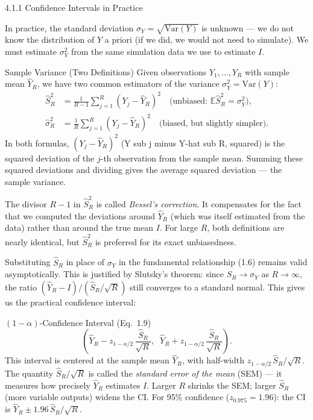 \documentclass[aspectratio=169,10pt]{beamer}
\begin{document}
\begin{frame}[allowframebreaks]{4.1.1 Confidence Intervals in Practice}

In practice, the standard deviation $\sigma_Y = \sqrt{\mathrm{Var}(Y)}$
is unknown --- we do not know the distribution of $Y$ a priori (if we did,
we would not need to simulate).  We must estimate $\sigma_Y^2$ from the
same simulation data we use to estimate $I$.

\begin{block}{Sample Variance (Two Definitions)}
  Given observations $Y_1, \ldots, Y_R$ with sample mean $\hat{Y}_R$,
  we have two common estimators of the variance $\sigma_Y^2 =
  \mathrm{Var}(Y)$:
  \begin{align*}
    \hat{S}_R^2 &= \frac{1}{R-1} \sum_{j=1}^{R} (Y_j - \hat{Y}_R)^2
      \quad \text{(unbiased: $\mathbb{E}\hat{S}_R^2 = \sigma_Y^2$),} \\[6pt]
    \hat{\sigma}_R^2 &= \frac{1}{R} \sum_{j=1}^{R} (Y_j - \hat{Y}_R)^2
      \quad \text{(biased, but slightly simpler).}
  \end{align*}
  In both formulas, $(Y_j - \hat{Y}_R)^2$ (Y sub j minus Y-hat sub R,
  squared) is the squared deviation of the $j$-th observation from the
  sample mean.  Summing these squared deviations and dividing gives
  the average squared deviation --- the sample variance.

  The divisor $R - 1$ in $\hat{S}_R^2$ is called \emph{Bessel's
  correction}.  It compensates for the fact that we computed the
  deviations around $\hat{Y}_R$ (which was itself estimated from the
  data) rather than around the true mean $I$.  For large $R$, both
  definitions are nearly identical, but $\hat{S}_R^2$ is preferred
  for its exact unbiasedness.
\end{block}

Substituting $\hat{S}_R$ in place of $\sigma_Y$ in the fundamental
relationship (1.6) remains valid asymptotically.  This is justified by
Slutsky's theorem: since $\hat{S}_R \to \sigma_Y$ as $R \to \infty$,
the ratio $(\hat{Y}_R - I)/(\hat{S}_R/\sqrt{R})$ still converges to
a standard normal.  This gives us the practical confidence interval:

\begin{block}{$(1-\alpha)$-Confidence Interval (Eq.\ 1.9)}
  \[
    \left(\hat{Y}_R - z_{1-\alpha/2}\,\frac{\hat{S}_R}{\sqrt{R}},\;\;
           \hat{Y}_R + z_{1-\alpha/2}\,\frac{\hat{S}_R}{\sqrt{R}}\right).
    \tag{1.9}
  \]
  This interval is centered at the sample mean $\hat{Y}_R$, with
  half-width $z_{1-\alpha/2}\,\hat{S}_R/\sqrt{R}$.  The quantity
  $\hat{S}_R/\sqrt{R}$ is called the \emph{standard error of the
  mean} (SEM) --- it measures how precisely $\hat{Y}_R$ estimates $I$.
  Larger $R$ shrinks the SEM; larger $\hat{S}_R$ (more variable outputs)
  widens the CI.  For 95\% confidence ($z_{0.975} = 1.96$):
  the CI is $\hat{Y}_R \pm 1.96\,\hat{S}_R/\sqrt{R}$.
\end{block}


\end{frame}
\end{document}
